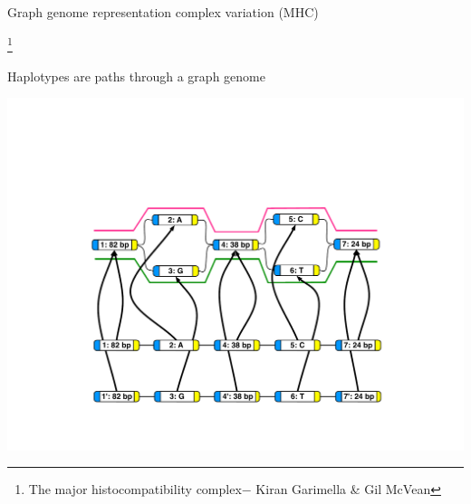 \documentclass[10pt,
               hyperref={bookmarks=false,
                         bookmarksopen=false,
                         colorlinks=true,
                         linkcolor=blue,
                         urlcolor=blue},
               xcolor={svgnames,table}]{beamer}
\newcommand\blfootnote[1]{%
  \begingroup
  \renewcommand\thefootnote{}\footnote{#1}%
  \addtocounter{footnote}{-1}%
  \endgroup
}
\begin{document}
\begin{frame}{Graph genome representation complex variation (MHC)}
  \begin{center}
    \end{center}
  \blfootnote{The major histocompatibility complex− Kiran Garimella \& Gil McVean}
\end{frame}

\begin{frame}{Haplotypes are paths through a graph genome}
  \begin{center}
    \includegraphics[scale=0.50]{images/graph-genome-haplotypes.pdf}
  \end{center}
\end{frame}
\end{document}
